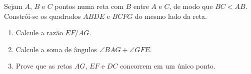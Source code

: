 Sejam $A$, $B$ e $C$ pontos numa reta com $B$ entre $A$ e $C$, de modo que $BC < AB$.
Constrói-se os quadrados $ABDE$ e $BCFG$ do mesmo lado da reta.

\begin{enumerate}[label = (\alph*)]
	\item Calcule a razão $EF/AG$.
	\item Calcule a soma de ângulos $\angle BAG + \angle GFE$.
	\item Prove que as retas $AG$, $EF$ e $DC$ concorrem em um único ponto.
\end{enumerate}

